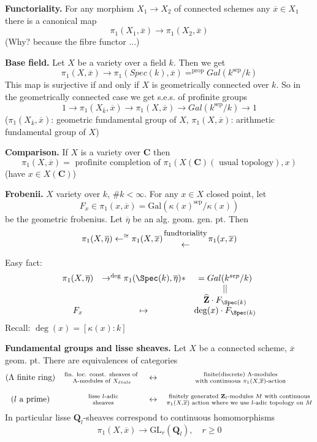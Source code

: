 \medskip\noindent
{\bf Functoriality.} For any morphism $X_1\to X_2$ of connected schemes
any $\overline x\in X_1$ there is a canonical map
$$
\pi_1(X_1, \overline x) \to \pi_1(X_2, \overline x)
$$
(Why? because the fibre functor ...)

\medskip\noindent
{\bf Base field.} Let $X$ be a variety over a field $k$. Then we get 	
$$
\pi_1(X, \overline x) \to
\pi_1(Spec(k), \overline x) =^{\text{prop}} Gal(k^{\text{sep}}/k)
$$
This map is surjective if and only if $X$ is geometrically connected over $k$.
So in the geometrically connected case we get s.e.s. of profinite
groups
$$
1 \to \pi_1(X_{\overline k}, \overline x) \to
\pi_1(X, \overline x) \to
Gal(k^{\text{sep}}/k) \to 1
$$
($\pi_1(X_{\overline k}, \overline x)$: geometric fundamental group of
$X$, $\pi_1(X, \overline x)$: arithmetic fundamental group of $X$)

\medskip\noindent
{\bf Comparison.} If $X$ is a variety over $\mathbf{C}$ then
$$
\pi_1(X, \overline x) =
\text{ profinite completion of }
\pi_1(X(\mathbf{C})(\text{ usual topology}), x)
$$
(have $x\in X(\mathbf{C})$)

\medskip\noindent
{\bf Frobenii.} $X$ variety over $k$, $\# k < \infty$. For any $x \in X$
closed point, let
$$
F_x\in \pi_1(x, \overline x) =
\text{Gal}(\kappa(x)^{\text{sep}}/\kappa(x))
$$
be the geometric frobenius.
Let $\overline\eta$ be an alg. geom. gen. pt. Then
$$
\pi_1(X, \overline\eta) \leftarrow^{\cong}
\pi_1(X, \overline x)
{\text{\small fundtoriality}\atop\leftarrow}
\pi_1(x, \overline x)
$$

\noindent
Easy fact:
$$
\begin{matrix}
\pi_1(X, \overline \eta) & \to^{\deg} \pi_1(\Spec(k), \overline \eta) * &
= Gal(k^{sep}/k) \\
& & || \\
& & \widehat{\mathbf{Z}}\cdot F_{\Spec(k)} \\
F_x & \mapsto & \deg(x)\cdot F_{\Spec(k)}
\end{matrix}
$$
Recall: $\deg(x) = [\kappa(x):k]$

\medskip\noindent
{\bf Fundamental groups and lisse sheaves.}
Let $X$ be a connected scheme, $\overline x$ geom. pt. There are
equivalences of categories
$$
\begin{matrix}
\text{($\Lambda$ finite ring)}& \text{fin. loc. const. sheaves
of }
\atop \Lambda\text{-modules of }X_{\acute{e}tale} & \leftrightarrow &
\text{ finite(discrete) }\Lambda\text{-modules}\atop\text{ with continuous
}\pi_1(X, \overline x)\text{-action}\\
\\
(l\text{ a prime}) & \text{ lisse }l\text{-adic}\atop\text{
sheaves} & \leftrightarrow & \text{ finitely generated
}\mathbf{Z}_l\text{-modules } M \text{ with continuous }\atop \pi_1(X,
\overline x)\text{ action where we use $l$-adic topology on } M
\end{matrix}
$$
In particular lisse $\mathbf{Q}_l$-sheaves correspond to continuous
homomorphisms
$$
\pi_1(X, \overline x) \to \text{GL}_r(\mathbf{Q}_l), \quad r\geq 0
$$

